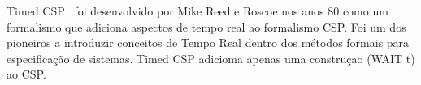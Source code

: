 Timed CSP~\cite{Schneider:1999:CRT:555233} foi desenvolvido por Mike Reed  e Roscoe nos anos 80 como um formalismo que adiciona
aspectos de tempo real ao formalismo CSP. Foi um dos pioneiros a introduzir conceitos de Tempo Real
dentro dos métodos formais para especificação de sistemas. Timed CSP adicioma apenas uma construçao (WAIT t) ao CSP.
